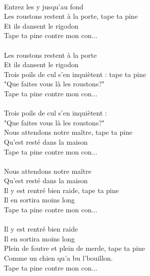 \\Entrez les y jusqu'au fond
\\Les roustons restent à la porte, tape ta pine
\\Et ils dansent le rigodon
\\Tape ta pine contre mon con...
\\\\Les roustons restent à la porte
\\Et ils dansent le rigodon
\\Trois poils de cul s'en inquiètent : tape ta pine
\\"Que faites vous là les roustons?"
\\Tape ta pine contre mon con...
\\\\Trois poils de cul s'en inquiètent : 
\\"Que faites vous là les roustons?"
\\Nous attendons notre maître, tape ta pine
\\Qu'est resté dans la maison
\\Tape ta pine contre mon con...
\\\\Nous attendons notre maître
\\Qu'est resté dans la maison
\\Il y est rentré bien raide, tape ta pine
\\Il en sortira moins long
\\Tape ta pine contre mon con...
\\\\Il y est rentré bien raide
\\Il en sortira moins long
\\Plein de foutre et plein de merde, tape ta pine
\\Comme un chien qu'a bu l'bouillon.
\\Tape ta pine contre mon con...

\breakpage